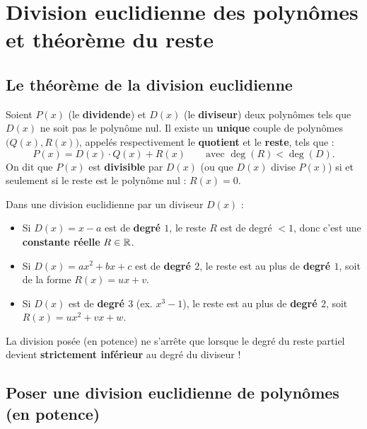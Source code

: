 \section{Division euclidienne des polynômes et théorème du reste}

\subsection{Le théorème de la division euclidienne}

\begin{theoreme}
Soient $P(x)$ (le \textbf{dividende}) et $D(x)$ (le \textbf{diviseur}) deux polynômes tels que $D(x)$ ne soit pas le polynôme nul. Il existe un \textbf{unique} couple de polynômes $\bigl(Q(x), R(x)\bigr)$, appelés respectivement le \textbf{quotient} et le \textbf{reste}, tels que :
\[
    \boxed{P(x) = D(x)\cdot Q(x) + R(x) \qquad \text{avec } \deg(R) < \deg(D)}.
\]
On dit que $P(x)$ est \textbf{divisible} par $D(x)$ (ou que $D(x)$ divise $P(x)$) si et seulement si le reste est le polynôme nul : $\boxed{R(x) = 0}$.
\end{theoreme}

\begin{attention}
Dans une division euclidienne par un diviseur $D(x)$ :
\begin{itemize}
    \item Si $D(x) = x - a$ est de \textbf{degré $1$}, le reste $R$ est de degré $< 1$, donc c'est une \textbf{constante réelle} $R \in \mathbb{R}$.
    \item Si $D(x) = ax^2 + bx + c$ est de \textbf{degré $2$}, le reste est au plus de \textbf{degré $1$}, soit de la forme $R(x) = ux + v$.
    \item Si $D(x)$ est de \textbf{degré $3$} (ex. $x^3 - 1$), le reste est au plus de \textbf{degré $2$}, soit $R(x) = ux^2 + vx + w$.
\end{itemize}
La division posée (en potence) ne s'arrête que lorsque le degré du reste partiel devient \textbf{strictement inférieur} au degré du diviseur !
\end{attention}

\subsection{Poser une division euclidienne de polynômes (en potence)}

